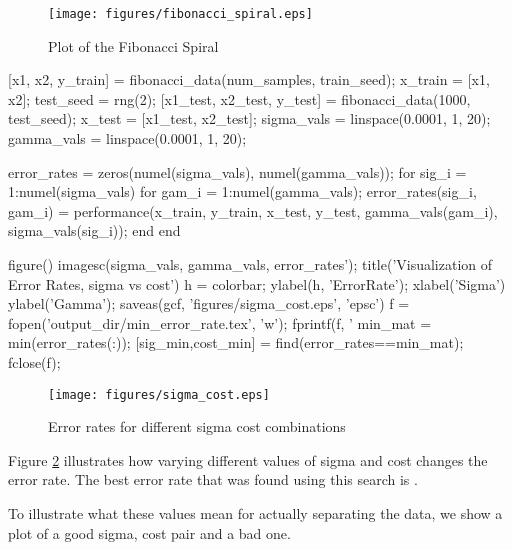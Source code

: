 \documentclass[11pt, twoside]{article}   	%
\newenvironment{matlab}{\comment}{\endcomment}
\begin{document}
\begin{figure}[h]
\centering
\texttt{[image: figures/fibonacci\_spiral.eps]}
\caption{Plot of the Fibonacci Spiral}
\label{fig:fibonacci_spiral} 
\end{figure}


\begin{matlab}

[x1, x2, y_train] = fibonacci_data(num_samples, train_seed);
x_train = [x1, x2];
test_seed = rng(2); 
[x1_test, x2_test, y_test] = fibonacci_data(1000, test_seed);
x_test = [x1_test, x2_test];
sigma_vals = linspace(0.0001, 1, 20); 
gamma_vals = linspace(0.0001, 1, 20);

error_rates = zeros(numel(sigma_vals), numel(gamma_vals)); 
for sig_i = 1:numel(sigma_vals)
   for gam_i = 1:numel(gamma_vals); 
      error_rates(sig_i, gam_i) = performance(x_train, y_train, x_test, y_test, gamma_vals(gam_i), sigma_vals(sig_i)); 
   end
end

figure()
imagesc(sigma_vals, gamma_vals, error_rates');
title('Visualization of Error Rates, sigma vs cost')
h = colorbar;
ylabel(h, 'ErrorRate');
xlabel('Sigma')
ylabel('Gamma'); 
saveas(gcf, 'figures/sigma_cost.eps', 'epsc')
f = fopen('output_dir/min_error_rate.tex', 'w'); 
fprintf(f, '%
min_mat = min(error_rates(:));
[sig_min,cost_min] = find(error_rates==min_mat);
fclose(f);
\end{matlab}

\begin{figure}[h]
\centering
\texttt{[image: figures/sigma\_cost.eps]}
\caption{Error rates for different sigma cost combinations}
\label{fig:sigma_cost} 
\end{figure}

Figure \ref{fig:sigma_cost} illustrates how varying different values of
sigma and cost changes the error rate. The best error rate that was found
using this search is .

To illustrate what these values mean for actually separating the data, we
show a plot of a good sigma, cost pair and a bad one. 
\end{document}
